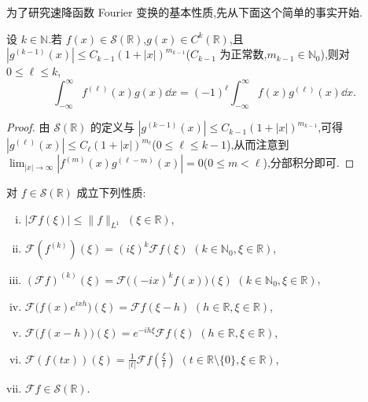 为了研究速降函数 Fourier 变换的基本性质,先从下面这个简单的事实开始.

\begin{lemma}\label{lem:1.2.7}
设 $k \in \mathbb{N}$.若 $f(x) \in \mathcal{S}(\mathbb{R})$,$g(x) \in C^{k}(\mathbb{R})$,且 $|g^{(k-1)}(x)| \leq C_{k-1}(1 + |x|)^{m_{k-1}}$($C_{k-1}$ 为正常数,$m_{k-1} \in \mathbb{N}_{0}$),则对 $0 \leq \ell \leq k$,
\begin{equation}\tag{1.2.8}
\int_{-\infty}^{\infty} f^{(\ell)}(x)g(x)\dd x = (-1)^{\ell}\int_{-\infty}^{\infty} f(x)g^{(\ell)}(x)\dd x.
\label{eq:1.2.8}\end{equation}
\end{lemma}

\begin{proof}
由 $\mathcal{S}(\mathbb{R})$ 的定义与 $|g^{(k-1)}(x)| \leq C_{k-1}(1 + |x|)^{m_{k-1}}$,可得 $|g^{(\ell)}(x)| \leq C_{\ell}(1 + |x|)^{m_{\ell}}$($0 \leq \ell \leq k - 1$),从而注意到 $\lim_{|x| \to \infty}|f^{(m)}(x)g^{(\ell-m)}(x)| = 0$($0 \leq m < \ell$),分部积分即可.
\end{proof}

\begin{theorem}\label{thm:1.2.8}
对 $f \in \mathcal{S}(\mathbb{R})$ 成立下列性质:
\begin{enumerate}[(i)]
\item $|\mathcal{F}f(\xi)| \leq \| f \|_{L^{1}}$ $(\xi \in \mathbb{R})$,
\item $\mathcal{F}(f^{(k)})(\xi) = (i\xi)^{k}\mathcal{F}f(\xi)$ $(k \in \mathbb{N}_{0}, \xi \in \mathbb{R})$,
\item $(\mathcal{F}f)^{(k)}(\xi) = \mathcal{F}\bigl((-ix)^{k}f(x)\bigr)(\xi)$ $(k \in \mathbb{N}_{0}, \xi \in \mathbb{R})$,
\item $\mathcal{F}\bigl(f(x)e^{ixh}\bigr)(\xi) = \mathcal{F}f(\xi - h)$ $(h \in \mathbb{R}, \xi \in \mathbb{R})$,
\item $\mathcal{F}\bigl(f(x - h)\bigr)(\xi) = e^{-ih\xi}\mathcal{F}f(\xi)$ $(h \in \mathbb{R}, \xi \in \mathbb{R})$,
\item $\mathcal{F}(f(tx))(\xi) = \frac{1}{|t|}\mathcal{F}f\left(\frac{\xi}{t}\right)$ $(t \in \mathbb{R}\setminus\{0\}, \xi \in \mathbb{R})$,
\item $\mathcal{F}f \in \mathcal{S}(\mathbb{R})$.
\end{enumerate}
\end{theorem}

